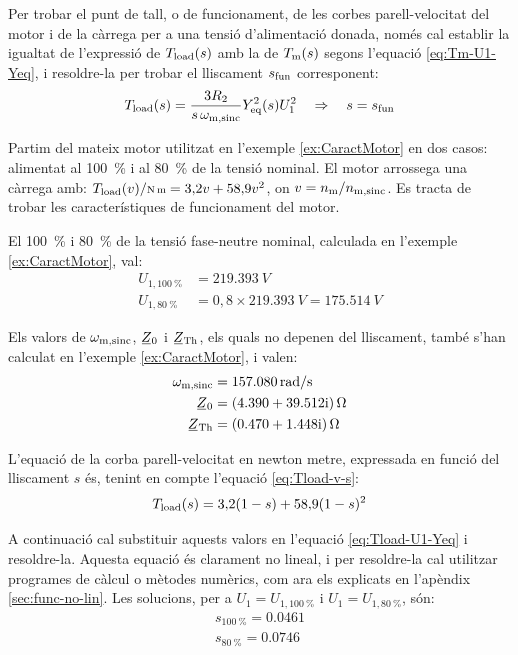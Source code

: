 Per trobar el punt de tall, o de funcionament, de les corbes parell-velocitat del motor i de la càrrega per a una tensió d'alimentació donada, només cal establir la igualtat de l'expressió de $T_\mathrm{load}(s)$ amb la de $T_\mathrm{m}(s)$ segons l'equació \eqref{eq:Tm-U1-Yeq}, i resoldre-la per  trobar el lliscament $s_\mathrm{fun}$ corresponent:
\begin{equation}\label{eq:Tload-U1-Yeq}
	T_\mathrm{load}(s) = \frac{3 R_2}{s\,\omega_\mathrm{m,sinc}} Y_\mathrm{eq}^2(s) U_1^2 \quad\Rightarrow \quad s=s_\mathrm{fun}
\end{equation}


\begin{exemple}\label{ex:MotTensRedSolEx}
	\addcontentsxms{\MotTensRedSolEx}
	Partim del mateix motor utilitzat en l'exemple \vref{ex:CaractMotor} en dos casos: alimentat al \qty{100}{\%} i al \qty{80}{\%} de la tensió nominal. El motor arrossega una càrrega amb: $T\ped{load}(v) /{\scriptstyle \unit{N.m}} = 3{,}2 v + 58{,}9 v^2$, on $v = n_\mathrm{m}/n_\mathrm{m,sinc}$. Es tracta de trobar les característiques de funcionament del motor.
	
	El \qty{100}{\%} i \qty{80}{\%} de la tensió fase-neutre nominal, calculada  en l'exemple \ref{ex:CaractMotor}, val:
	\begin{align*}
		U_{1,\qty{100}{\%}} &= \qty{219,393}{V} \\
		U_{1,\qty{80}{\%}} &= 0{,}8\times\qty{219,393}{V} = \qty{175,514}{V}
	\end{align*}

	Els valors de $\omega_\mathrm{m,sinc}$, $\cmplx{Z}_0$ i  $\cmplx{Z}\ped{Th}$, els quals no depenen del lliscament, també s'han calculat en  l'exemple \ref{ex:CaractMotor}, i valen:
	\vspace{-2mm}
	\begin{align*}
		\omega\ped{m,sinc} &=  \qty{157,080}{rad/s} \\
		\cmplx{Z}_0 &=  \complexqty{4,390+j39,512}{\ohm} \\
		\cmplx{Z}\ped{Th} &= \complexqty{0,470+j1,448}{\ohm} 
	\end{align*}
	
	L'equació de la corba parell-velocitat en newton metre, expressada en funció del lliscament $s$ és, tenint en compte l'equació \eqref{eq:Tload-v-s}:
	\[
		T_\mathrm{load}(s) = 3{,}2 (1-s) + 58{,}9 (1-s)^2
	\]

	A continuació cal substituir aquests valors en l'equació \eqref{eq:Tload-U1-Yeq} i resoldre-la. Aquesta equació és clarament no lineal, i per  resoldre-la cal utilitzar programes de càlcul o mètodes numèrics, com ara els explicats en l'apèndix \ref{sec:func-no-lin}. Les solucions, per a $U_1=U_{1,\qty{100}{\%}}$ i $U_1=U_{1,\qty{80}{\%}}$, són:
	\begin{align*}
		s_{\qty{100}{\%}} = \num{0,0461} \\
	 	s_{\qty{80}{\%}}= \num{0,0746}
	\end{align*}	
	

\end{exemple}
